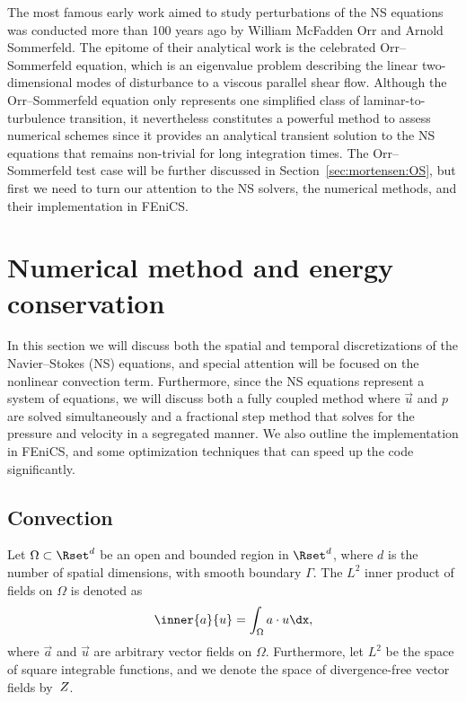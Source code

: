 The most famous early work aimed to study perturbations of the NS
equations was conducted more than 100 years ago by William McFadden
Orr and Arnold Sommerfeld. The epitome of their analytical work
is the celebrated Orr--Sommerfeld equation, which is an eigenvalue
problem describing the linear two-dimensional modes of disturbance to a
viscous parallel shear flow. Although the Orr--Sommerfeld equation only
represents one simplified class of laminar-to-turbulence transition, it
nevertheless constitutes a powerful method to assess numerical schemes
since it provides an analytical transient solution to the NS equations
that remains non-trivial for long integration times. The Orr--Sommerfeld
test case will be further discussed in Section~\ref{sec:mortensen:OS},
but first we need to turn our attention to the NS solvers, the numerical
methods, and their implementation in FEniCS.

\section{Numerical method and energy conservation}
\label{sec:mortensen:Numerical}

In this section we will discuss both the spatial and temporal
discretizations of the Navier--Stokes (NS) equations, and special
attention will be focused on the nonlinear convection term. Furthermore,
since the NS equations represent a system of equations, we will
discuss both a fully coupled method where $\vec{u}$ and $p$ are solved
simultaneously and a fractional step method that solves for the pressure
and velocity in a segregated manner. We also outline the implementation
in FEniCS, and some optimization techniques that can speed up the code
significantly.

\subsection{Convection}
\label{sec:mortensen:Convection}

Let $\Omega \subset \Rset^d$ be an open and bounded region in $\Rset^d$,
where $d$ is the number of spatial dimensions, with smooth boundary
$\Gamma$. The $L^2$ inner product of fields on $\Omega$ is denoted as
\begin{equation}
 \inner{\vec{a}}{\vec{u}} = \int_{\Omega} \vec{a}\cdot \vec{u} \dx,
 \label{eq:mortensen:L2}
\end{equation}
where $\vec{a}$ and $\vec{u}$ are arbitrary vector fields on
$\Omega$. Furthermore, let $L^2$ be the space of square integrable
functions, and we denote the space of divergence-free vector fields
by~$Z$.

